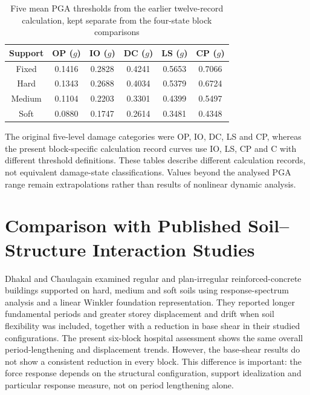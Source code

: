 \begin{table}[htbp]
\fontsize{11}{13}\selectfont\setlength{\tabcolsep}{4pt}
\centering
\caption{Five mean PGA thresholds from the earlier twelve-record calculation, kept separate from the four-state block comparisons}
\label{tab:seq068_legacy_five_state_thresholds}
\renewcommand{\arraystretch}{1.12}
\begin{tabular*}{\linewidth}{@{\extracolsep{\fill}}cccccc@{}}
\toprule
Support & OP ($g$) & IO ($g$) & DC ($g$) & LS ($g$) & CP ($g$) \\
\midrule
Fixed & 0.1416 & 0.2828 & 0.4241 & 0.5653 & 0.7066 \\
Hard & 0.1343 & 0.2688 & 0.4034 & 0.5379 & 0.6724 \\
Medium & 0.1104 & 0.2203 & 0.3301 & 0.4399 & 0.5497 \\
Soft & 0.0880 & 0.1747 & 0.2614 & 0.3481 & 0.4348 \\
\bottomrule
\end{tabular*}
\end{table}
\noindent The original five-level damage categories were OP, IO, DC, LS and CP, whereas the present block-specific calculation record curves use IO, LS, CP and C with different threshold definitions. These tables describe different calculation records, not equivalent damage-state classifications. Values beyond the analysed PGA range remain extrapolations rather than results of nonlinear dynamic analysis.\par


\section{Comparison with Published Soil--Structure Interaction Studies}

Dhakal and Chaulagain \cite{dhakal2023} examined regular and plan-irregular reinforced-concrete buildings supported on hard, medium and soft soils using response-spectrum analysis and a linear Winkler foundation representation. They reported longer fundamental periods and greater storey displacement and drift when soil flexibility was included, together with a reduction in base shear in their studied configurations. The present six-block hospital assessment shows the same overall period-lengthening and displacement trends. However, the base-shear results do not show a consistent reduction in every block. This difference is important: the force response depends on the structural configuration, support idealization and particular response measure, not on period lengthening alone.

